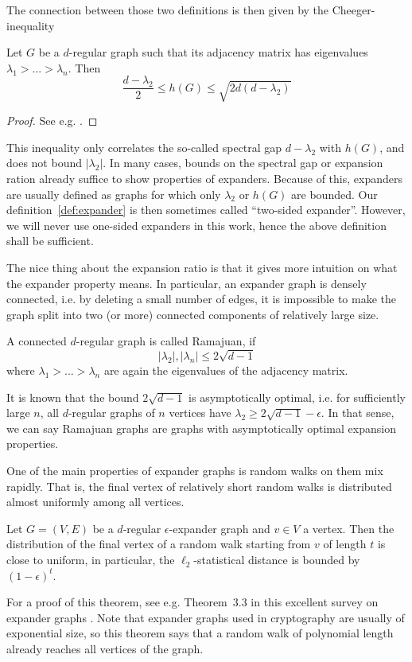 The connection between those two definitions is then given by the Cheeger-inequality
\begin{prop}
    Let $G$ be a $d$-regular graph such that its adjacency matrix has eigenvalues $\lambda_1 > ... > \lambda_n$.
    Then
    \begin{equation*}
        \frac {d - \lambda_2} 2 \leq h(G) \leq \sqrt{2d(d - \lambda_2)}
    \end{equation*}
\end{prop}
\begin{proof}
    See e.g. \cite{cheeger_inequality}.
\end{proof}
This inequality only correlates the so-called spectral gap $d - \lambda_2$ with $h(G)$, and does not bound $|\lambda_2|$.
In many cases, bounds on the spectral gap or expansion ration already suffice to show properties of expanders.
Because of this, expanders are usually defined as graphs for which only $\lambda_2$ or $h(G)$ are bounded.
Our definition~\ref{def:expander} is then sometimes called ``two-sided expander''.
However, we will never use one-sided expanders in this work, hence the above definition shall be sufficient.

The nice thing about the expansion ratio is that it gives more intuition on what the expander property means.
In particular, an expander graph is densely connected, i.e. by deleting a small number of edges, it is impossible to make the graph split into two (or more) connected components of relatively large size.
\begin{definition}
    A connected $d$-regular graph is called Ramajuan, if
    \begin{equation*}
        |\lambda_2|, |\lambda_n| \leq 2\sqrt{d - 1}
    \end{equation*}
    where $\lambda_1 > ... > \lambda_n$ are again the eigenvalues of the adjacency matrix.
\end{definition}
It is known that the bound $2\sqrt{d - 1}$ is asymptotically optimal, i.e. for sufficiently large $n$, all $d$-regular graphs of $n$ vertices have $\lambda_2 \geq 2\sqrt{d - 1} - \epsilon$.
In that sense, we can say Ramajuan graphs are graphs with asymptotically optimal expansion properties.

One of the main properties of expander graphs is random walks on them mix rapidly.
That is, the final vertex of relatively short random walks is distributed almost uniformly among all vertices.
\begin{theorem}
    \label{prop:expander_random_walk}
    Let $G = (V, E)$ be a $d$-regular $\epsilon$-expander graph and $v \in V$ a vertex.
    Then the distribution of the final vertex of a random walk starting from $v$ of length $t$ is close to uniform, in particular, the $\ell_2$-statistical distance is bounded by $(1 - \epsilon)^t$.
\end{theorem}
For a proof of this theorem, see e.g. Theorem~3.3 in this excellent survey on expander graphs \cite{expander_survey}.
Note that expander graphs used in cryptography are usually of exponential size, so this theorem says that a random walk of polynomial length already reaches all vertices of the graph.

